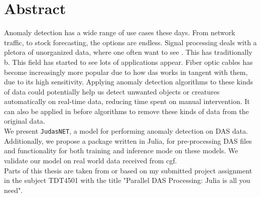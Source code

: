 \chapter*{Abstract}

\das
Anomaly detection has a wide range of use cases these days. From network traffic, to stock forecasting, the options are endless. 
Signal processing deals with a pletora of unorganized data, where one often want to see . This has traditionally b. 
This field has started to see lots of applications appear. Fiber optic cables has become increasingly more popular due to how \acrshort{das} works in tangent with them, due to its high sensitivity. Applying anomaly detection algorithms to these kinds of data could potentially help us detect unwanted objects or creatures automatically on real-time data, reducing time spent on manual intervention. It can also be applied in before algorithms to remove these kinds of data from the original data. \\

We present \texttt{JudasNET}, a model for performing anomaly detection on DAS data. Additionally, we propose a package written in Julia, for pre-processing DAS files \cite{projthesis} and functionality for both training and inference mode on these models. We validate our model on real world data received from \acrfull{cgf}.   \\

Parts of this thesis are taken from or based on my submitted project assignment in the subject TDT4501 with the title "Parallel DAS Processing: Julia is all you need".